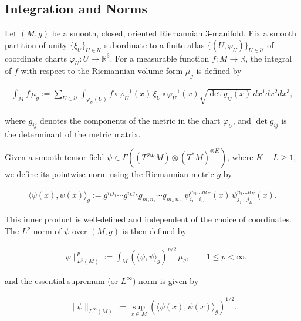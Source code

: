 \documentclass{amsart}
\begin{document}
\subsection{Integration and Norms}

\noindent Let \( (M, g) \) be a smooth, closed, oriented Riemannian $3$-manifold. Fix a smooth partition of unity \( \{ \xi_U \}_{U \in \mathcal{U}} \) subordinate to a finite atlas \( \{ (U, \varphi_U) \}_{U \in \mathcal{U}} \) of coordinate charts \( \varphi_U: U \to \mathbb{R}^3 \). For a measurable function \( f: M \to \mathbb{R} \), the integral of \( f \) with respect to the Riemannian volume form \( \mu_g \) is defined by

\begin{align} 
\label{eq:integration}
\int_M f \, \mu_g := \sum_{U \in \mathcal{U}} \int_{\varphi_U(U)} f \circ \varphi_U^{-1}(x) \, \xi_U \circ \varphi_U^{-1}(x) \sqrt{\det g_{ij}(x)} \, dx^1 dx^2 dx^3,
\end{align}

\noindent where \( g_{ij} \) denotes the components of the metric in the chart \( \varphi_U \), and \( \det g_{ij} \) is the determinant of the metric matrix.

\noindent Given a smooth tensor field \( \psi \in \Gamma\left( (T^{\otimes L} M) \otimes (T^* M)^{\otimes K} \right) \), where \( K + L \geq 1 \), we define its pointwise norm using the Riemannian metric \( g \) by

\begin{align} \label{eq:pointwise-norm}
\langle \psi(x), \psi(x) \rangle_g := g^{i_1 j_1} \cdots g^{i_L j_L} g_{m_1 n_1} \cdots g_{m_K n_K} \,
\psi^{m_1 \dots m_K}_{i_1 \dots i_L}(x) \, \psi^{n_1 \dots n_K}_{j_1 \dots j_L}(x).
\end{align}

\noindent This inner product is well-defined and independent of the choice of coordinates. The \( L^p \) norm of \( \psi \) over \( (M, g) \) is then defined by

\begin{align} \label{eq:Lp-norm}
\| \psi \|_{L^p(M)}^p := \int_M \left( \langle \psi, \psi \rangle_g \right)^{p/2} \, \mu_g, \qquad 1 \leq p < \infty,
\end{align}

\noindent and the essential supremum (or \( L^\infty \)) norm is given by

\begin{align} \label{eq:Linf-norm}
\| \psi \|_{L^\infty(M)} := \sup_{x \in M} \left( \langle \psi(x), \psi(x) \rangle_g \right)^{1/2}.
\end{align}
\end{document}

